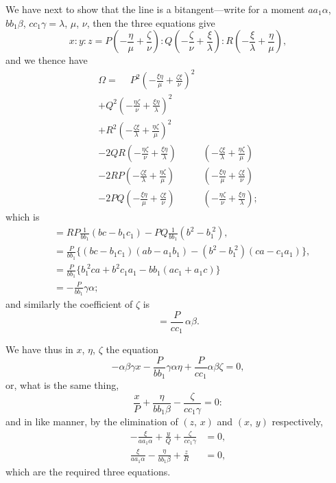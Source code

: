 \documentclass[11pt,a4paper]{book}
\begin{document}
We have next to show that the line is a bitangent---write for a moment $aa_1\alpha$, $bb_1\beta$, $cc_1\gamma = \lambda$, $\mu$, $\nu$, then the three equations give
\[
x : y : z = P\left(-\frac{\eta}{\mu} + \frac{\zeta}{\nu}\right) : Q\left(-\frac{\zeta}{\nu} + \frac{\xi}{\lambda}\right) : R\left(-\frac{\xi}{\lambda} + \frac{\eta}{\mu}\right),
\]
and we thence have
\begin{align*}
\Omega =\phantom{+} P^2\left(-\frac{\xi\eta}{\mu} + \frac{\zeta\xi}{\nu}\right)^2&\\
+ Q^2\left(-\frac{\eta\zeta}{\nu} + \frac{\xi\eta}{\lambda}\right)^2&\\
+ R^2\left(-\frac{\zeta\xi}{\lambda} + \frac{\eta\zeta}{\mu}\right)^2&\\
- 2QR\left(-\frac{\eta\zeta}{\nu} + \frac{\xi\eta}{\lambda}\right)&\left(-\frac{\zeta\xi}{\lambda} + \frac{\eta\zeta}{\mu}\right)\\
- 2RP\left(-\frac{\zeta\xi}{\lambda} + \frac{\eta\zeta}{\mu}\right)&\left(-\frac{\xi\eta}{\mu} + \frac{\zeta\xi}{\nu}\right)\\
- 2PQ\left(-\frac{\xi\eta}{\mu} + \frac{\zeta\xi}{\nu}\right)&\left(-\frac{\eta\zeta}{\nu} + \frac{\xi\eta}{\lambda}\right);
\end{align*}
which is
\begin{align*}
&= RP\frac{1}{bb_1}(bc - b_1c_1) - PQ\frac{1}{bb_1}(b^2 - b_1^{\;2}),\\
&= \frac{P}{bb_1}\{(bc - b_1c_1)(ab - a_1b_1) - (b^2 - b_1^{\;2})(ca - c_1a_1)\},\\
&= \frac{P}{bb_1}\{b_1^{\;2}ca + b^2c_1a_1 - bb_1(ac_1 + a_1c)\}\\
&= -\frac{P}{bb_1}\gamma\alpha;
\end{align*}
and similarly the coefficient of $\zeta$ is
\[
= \frac{P}{cc_1}\,\alpha\beta.
\]

We have thus in $x$, $\eta$, $\zeta$ the equation
\[
-\alpha\beta\gamma x - \frac{P}{bb_1}\gamma\alpha\eta + \frac{P}{cc_1}\alpha\beta\zeta = 0,
\]
or, what is the same thing,
\[
\frac{x}{P} + \frac{\eta}{bb_1\beta} - \frac{\zeta}{cc_1\gamma} = 0:
\]
and in like manner, by the elimination of $(z,\,x)$ and $(x,\,y)$ respectively,
\begin{align*}
-\frac{\xi}{aa_1\alpha} + \frac{y}{Q} + \frac{\zeta}{cc_1\gamma} &= 0,\\
\frac{\xi}{aa_1\alpha} - \frac{\eta}{bb_1\beta} + \frac{z}{R} &= 0,
\end{align*}
which are the required three equations.
\end{document}
